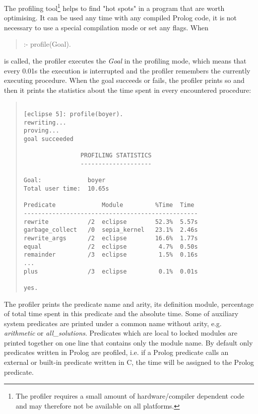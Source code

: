 The profiling tool\footnote{%
  The profiler requires a small amount of
  hardware/compiler dependent code and may therefore not be available on
  all platforms.}
helps to find "hot spots" in a program that are worth optimising.
It can be used any time with any compiled Prolog code,
it is not necessary to use a special compilation mode or set
any flags.
When
\begin{quote}
:- profile(Goal).
\end{quote}
is called, the profiler executes the {\it Goal} in the profiling mode,
which means that every 0.01s the execution is interrupted
and the profiler remembers the currently executing procedure.
When the goal succeeds or fails, the profiler prints so
and then it prints the statistics about the time spent
in every encountered procedure:

\begin{quote}
\begin{verbatim}

[eclipse 5]: profile(boyer).
rewriting...
proving...
goal succeeded

                PROFILING STATISTICS
                --------------------

Goal:             boyer
Total user time:  10.65s

Predicate             Module         %Time  Time
-------------------------------------------------
rewrite           /2  eclipse        52.3%  5.57s
garbage_collect   /0  sepia_kernel   23.1%  2.46s
rewrite_args      /2  eclipse        16.6%  1.77s
equal             /2  eclipse         4.7%  0.50s
remainder         /3  eclipse         1.5%  0.16s
...
plus              /3  eclipse         0.1%  0.01s

yes.
\end{verbatim}
\end{quote}

The profiler prints the predicate name and arity, its definition module,
percentage of total time spent in this predicate and the absolute time.
Some of auxiliary system predicates are printed under a
common name without arity, e.g. {\it arithmetic} or {\it all_solutions}.
Predicates which are local to locked modules are printed
together on one line that contains only the module name.
By default only predicates written in Prolog are profiled, i.e.
if a Prolog predicate calls an external or built-in predicate
written in C, the time will be assigned to the Prolog predicate.

